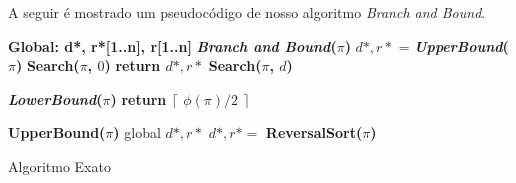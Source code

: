 A seguir é mostrado um pseudocódigo de nosso algoritmo \textit{Branch and Bound}.

\begin{algorithm}[H]
\label{Algoritmo Exato}
\SetAlgoLined
\textbf{Global: d*, r*[1..n], r[1..n]}\;
\textbf{\textit{Branch and Bound}($\pi$)}\;
  \quad  $d*, r*$ = \textbf{\textit{UpperBound}($\pi$)}\;
  \quad \textbf{Search($\pi$, $0$)}\;
  \quad \textbf{return $d*, r*$}\;
\textbf{Search($\pi$, $d$)}\; 
    \quad{}
\quad {} 

\textbf{\textit{LowerBound}($\pi$)}\;
\quad \textbf{return $\lceil$ $\phi(\pi)/ 2$ $\rceil$}\;

\textbf{UpperBound($\pi$)}\;
\quad global $d*, r*$\;
\quad $d*, r* = $ \textbf{ReversalSort($\pi$)}

 \caption{Algoritmo Exato}
\end{algorithm}

